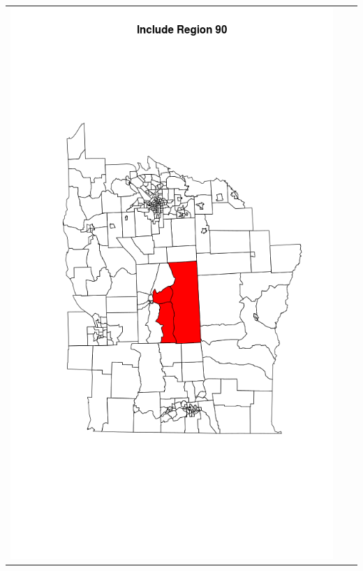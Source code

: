 \documentclass[12pt]{article}
\begin{document}
\begin{tabular}{|c|c|c|}
						\includegraphics[scale=0.2]{ny90.png}

\end{tabular}
\end{document}

